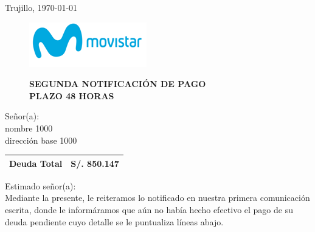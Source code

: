 %
%

\begin{flushright}
    Trujillo, \today
\end{flushright}
\vspace{-0.5cm}

\begin{figure}[h]
\begin{minipage}[b]{5.106458333cm}
\includegraphics[natwidth=5.106458333cm, natheight=1.931458333cm]{resources/business_logo.png}
\end{minipage}
\begin{minipage}[b][1.9314cm][t]{11cm}
\begin{flushright}
{\LARGE \bf SEGUNDA NOTIFICACIÓN DE PAGO\\PLAZO 48 HORAS}
\end{flushright}
\end{minipage}
\end{figure}

\noindent
Señor(a):\\
nombre 1000\\
dirección base 1000

\begin{flushright}
\bf \large
\begin{tabular}{|p{3.2cm} p{3.2cm}|}
\hline
Deuda Total & S/. 850.147 \\
\hline
\end{tabular}
\end{flushright}

\noindent
Estimado señor(a):\\
Mediante la presente, le reiteramos lo notificado en nuestra primera comunicación escrita, donde le informáramos que aún no había hecho efectivo el pago de su deuda pendiente cuyo detalle se le puntualiza líneas abajo.

